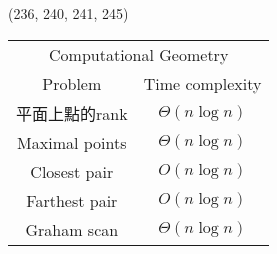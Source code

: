 \item \begin{theorem}{(236, 240, 241, 245)} \quad\quad
    \begin{table}[H]
        \centering
        \begin{tabular}{|c|c|}
            \hline
            \multicolumn{2}{|c|}{Computational Geometry} \\
            \Xhline{3\arrayrulewidth}
            Problem & Time complexity \\
            \Xhline{2\arrayrulewidth}
            平面上點的rank & $\Theta(n\log n)$ \\
            \hline
            Maximal points & $\Theta(n\log n)$ \\
            \hline
            Closest pair & $O(n\log n)$ \\
            \hline
            Farthest pair & $O(n\log n)$ \\
            \hline
            Graham scan & $\Theta(n\log n)$ \\
            \hline
        \end{tabular}
    \end{table}
\end{theorem}